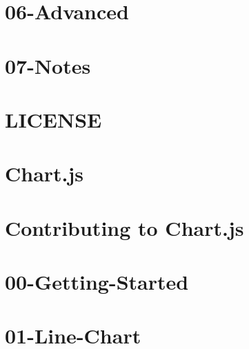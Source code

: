 \documentclass[twoside]{book}
\newcommand{\+}{\discretionary{\mbox{\scriptsize$\hookleftarrow$}}{}{}}
\begin{document}
\chapter{06-\/\+Advanced}
\label{md_app_web_bower_components__chart_8js_docs_06-_advanced}

\chapter{07-\/\+Notes}
\label{md_app_web_bower_components__chart_8js_docs_07-_notes}

\chapter{L\+I\+C\+E\+N\+SE}
\label{md_app_web_bower_components__chart_8js__l_i_c_e_n_s_e}

\chapter{Chart.\+js}
\label{md_app_web_bower_components__chart_8js__r_e_a_d_m_e}

\chapter{Contributing to Chart.\+js}
\label{md_app_web_bower_components_chartjs__c_o_n_t_r_i_b_u_t_i_n_g}

\chapter{00-\/\+Getting-\/\+Started}
\label{md_app_web_bower_components_chartjs_docs_00-_getting-_started}

\chapter{01-\/\+Line-\/\+Chart}
\label{md_app_web_bower_components_chartjs_docs_01-_line-_chart}

\end{document}
